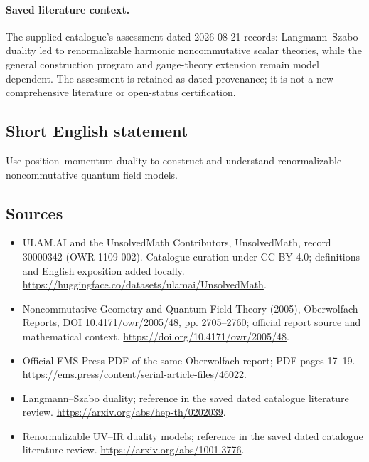 \documentclass[11pt]{article}
\begin{document}
\paragraph{Saved literature context.} The supplied catalogue's assessment dated 2026-08-21 records: Langmann--Szabo duality led to renormalizable harmonic noncommutative scalar theories, while the general construction program and gauge-theory extension remain model dependent. The assessment is retained as dated provenance; it is not a new comprehensive literature or open-status certification.
\subsection{Short English statement}
Use position--momentum duality to construct and understand renormalizable noncommutative quantum field models.
\subsection{Sources}
\begin{itemize}
\item[\hypertarget{source:30000342:1}{S1}] ULAM.AI and the UnsolvedMath Contributors, UnsolvedMath, record 30000342 (OWR-1109-002). Catalogue curation under CC BY 4.0; definitions and English exposition added locally.
\url{https://huggingface.co/datasets/ulamai/UnsolvedMath}.
\item[\hypertarget{source:30000342:2}{S2}] Noncommutative Geometry and Quantum Field Theory (2005), Oberwolfach Reports, DOI 10.4171/owr/2005/48, pp. 2705--2760; official report source and mathematical context.
\url{https://doi.org/10.4171/owr/2005/48}.
\item[\hypertarget{source:30000342:3}{S3}] Official EMS Press PDF of the same Oberwolfach report; PDF pages 17--19.
\url{https://ems.press/content/serial-article-files/46022}.
\item[\hypertarget{source:30000342:4}{S4}] Langmann--Szabo duality; reference in the saved dated catalogue literature review.
\url{https://arxiv.org/abs/hep-th/0202039}.
\item[\hypertarget{source:30000342:5}{S5}] Renormalizable UV--IR duality models; reference in the saved dated catalogue literature review.
\url{https://arxiv.org/abs/1001.3776}.
\end{itemize}
\label{end:30000342}
\end{document}
